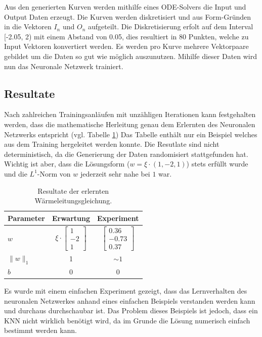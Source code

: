 Aus den generierten Kurven werden mithilfe eines ODE-Solvers die Input und Output Daten erzeugt. Die Kurven werden diskretisiert und aus Form-Gründen in die Vektoren $I_n$ und $O_n$ aufgeteilt. Die Diskretisierung erfolt auf dem Interval [-2.05, 2) mit einem Abstand von 0.05, dies resultiert in 80 Punkten, welche zu Input Vektoren konvertiert werden. Es werden pro Kurve mehrere Vektorpaare gebildet um die Daten so gut wie möglich auszunutzen. Mihilfe dieser Daten wird nun das Neuronale Netzwerk trainiert.

\subsection{Resultate}
Nach zahlreichen Trainingsanläufen mit unzähligen Iterationen kann festgehalten werden, dass die mathematische Herleitung genau dem Erlernten des Neuronalen Netzwerks entspricht (vgl. Tabelle \ref{tbl:result_heat}) Das Tabelle enthält nur ein Beispiel welches aus dem Training hergeleitet werden konnte. Die Resutlate sind nicht deterministisch, da die Generierung der Daten randomisiert stattgefunden hat. Wichtig ist aber, dass die Lösungsform ($w = \xi \cdot (1, -2, 1)$) stets erfüllt wurde und die $L^1$-Norm von $w$ jederzeit sehr nahe bei $1$ war.

\begin{table}
	\centering
	\def\arraystretch{1.1}
	\begin{tabular}{l|c|c}
		Parameter & Erwartung & Experiment \\
		\hline
		$w$ & $\xi \cdot \begin{bmatrix} 1 \\ -2 \\ 1 \end{bmatrix}$ & $\begin{bmatrix} 0.36 \\ -0.73 \\ 0.37 \end{bmatrix}$ \\
		$\|w\|_{1}$ & 1 & $\sim 1$ \\
		$b$ & 0 & 0 \\
	\end{tabular}
	\label{tbl:result_heat}
	\caption{Resultate der erlernten Wärmeleitungsgleichung.}
\end{table}

Es wurde mit einem einfachen Experiment gezeigt, dass das Lernverhalten des neuronalen Netzwerkes anhand eines einfachen Beispiels verstanden werden kann und durchaus durchschaubar ist. Das Problem dieses Beispiels ist jedoch, dass ein KNN nicht wirklich benötigt wird, da im Grunde die Lösung numerisch einfach bestimmt werden kann.